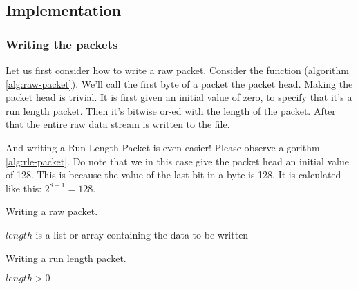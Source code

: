 \begin{refsection}
\subsection{Implementation}
\label{sec:implementation}

\subsubsection{Writing the packets}
\label{sec:writing-packets}

Let us first consider how to write a raw packet. Consider the function
(algorithm \ref{alg:raw-packet}). We'll
call the first byte of a packet the packet head. Making the packet head
is trivial. It is first given an initial value of zero, to specify
that it's a run length packet. Then it's bitwise or-ed with the length
of the packet. After that the entire raw data stream is written to the
file.

And writing a Run Length Packet is even easier! Please observe
algorithm \ref{alg:rle-packet}. Do note that we in this case give the
packet head an initial value of 128. This is because the value of the
last bit in a byte is 128. It is calculated like this: $2^{8-1} =
128$.

\begin{algorithm}[h]
  \caption{Writing a raw packet.}
  \label{alg:raw-packet}
  \begin{algorithmic}[1]
    \Require $length$ is a list or array containing the data to be written
      \State {}
        \State {}
      \EndForEach
    \EndFunction
  \end{algorithmic}
\end{algorithm}

\begin{algorithm}[h]
  \caption{Writing a run length packet.}
  \label{alg:rle-packet}
  \begin{algorithmic}[1]
    \Require $length > 0$
      \State {}
      \State {}
    \EndFunction
  \end{algorithmic}
\end{algorithm}


\end{refsection}
